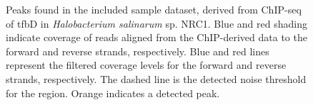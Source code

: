 \documentclass{bioinfo}
\begin{document}

\begin{figure}[!tfbd data - reasonable spot showing curation]%
  \begin{center}
    {}
    {}
  \end{center}
  \caption{Peaks found in the included sample dataset, derived from
    ChIP-seq of tfbD in {\em Halobacterium salinarum} sp. NRC1. Blue
    and red shading indicate coverage of reads aligned from the
    ChIP-derived data to the forward and reverse strands,
    respectively. Blue and red lines represent the filtered coverage
    levels for the forward and reverse strands, respectively. The
    dashed line is the detected noise threshold for the region. Orange
    indicates a detected peak.}\label{fig:02}
\end{figure}
\end{document}
